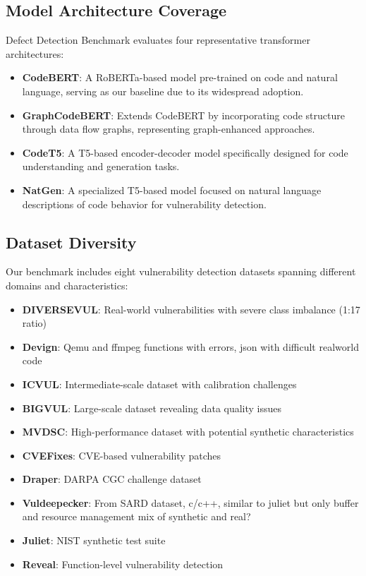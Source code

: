 \documentclass[letterpaper]{article}
\begin{document}
\subsection{Model Architecture Coverage}
Defect Detection Benchmark evaluates four representative transformer architectures:

\begin{itemize}
	\item \textbf{CodeBERT}: A RoBERTa-based model pre-trained on code and natural language, serving as our baseline due to its widespread adoption.

	\item \textbf{GraphCodeBERT}: Extends CodeBERT by incorporating code structure through data flow graphs, representing graph-enhanced approaches.

	\item \textbf{CodeT5}: A T5-based encoder-decoder model specifically designed for code understanding and generation tasks.

	\item \textbf{NatGen}: A specialized T5-based model focused on natural language descriptions of code behavior for vulnerability detection.
\end{itemize}

\subsection{Dataset Diversity}
Our benchmark includes eight vulnerability detection datasets spanning different domains and characteristics:
\begin{itemize}
	\item \textbf{DIVERSEVUL}: Real-world vulnerabilities with severe class imbalance (1:17 ratio)
	\item \textbf{Devign}: Qemu and ffmpeg functions with errors, json with difficult realworld code
	\item \textbf{ICVUL}: Intermediate-scale dataset with calibration challenges
	\item \textbf{BIGVUL}: Large-scale dataset revealing data quality issues
	\item \textbf{MVDSC}: High-performance dataset with potential synthetic characteristics
	\item \textbf{CVEFixes}: CVE-based vulnerability patches
	\item \textbf{Draper}: DARPA CGC challenge dataset
	\item \textbf{Vuldeepecker}: From SARD dataset, c/c++, similar to juliet but only buffer and resource management mix of synthetic and real?
	\item \textbf{Juliet}: NIST synthetic test suite
	\item \textbf{Reveal}: Function-level vulnerability detection
\end{itemize}
\end{document}
